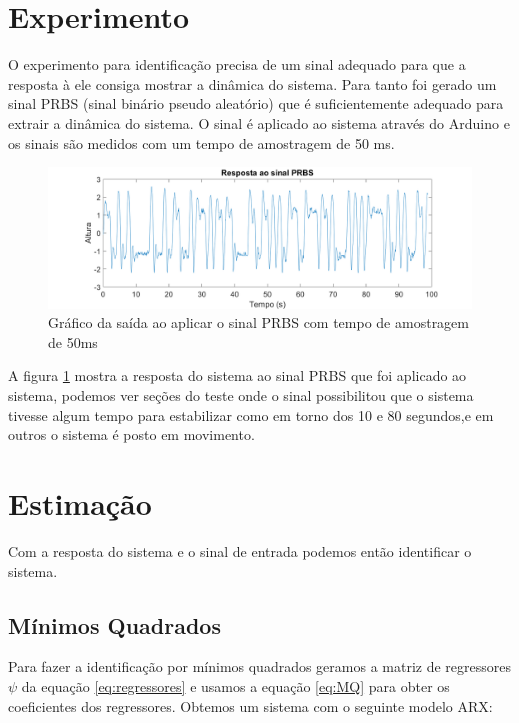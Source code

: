 \section{Experimento}\label{s:4experimento}
O experimento para identificação precisa de um sinal adequado para que a resposta à ele consiga mostrar a dinâmica do sistema. Para tanto foi gerado um sinal PRBS (sinal binário pseudo aleatório) que é suficientemente adequado para extrair a dinâmica do sistema. O sinal é aplicado ao sistema através do Arduino e os sinais são medidos com um tempo de amostragem de 50 ms.
\begin{figure}[H]
	\centering
	\includegraphics[width=1.1\linewidth]{sinalprbsid}
	\caption[Gráfico da saída PRBS]{Gráfico da saída ao aplicar o sinal PRBS com tempo de amostragem de 50ms}
	\label{fig:sinalprbsid}
\end{figure}

A figura \ref{fig:sinalprbsid} mostra a resposta do sistema ao sinal PRBS que foi aplicado ao sistema, podemos ver seções do teste onde o sinal possibilitou que o sistema tivesse algum tempo para estabilizar como em torno dos 10 e 80 segundos,e em outros o sistema é posto em movimento.

\section{Estimação}\label{s:4estimacao}

Com a resposta do sistema e o sinal de entrada podemos então identificar o sistema.  
\subsection{Mínimos Quadrados}\label{s:4estmq}
Para fazer a identificação por mínimos quadrados geramos a matriz de regressores $\psi$ da equação \ref{eq:regressores} e usamos a equação \ref{eq:MQ} para obter os coeficientes dos regressores. Obtemos um sistema com o seguinte modelo ARX:


